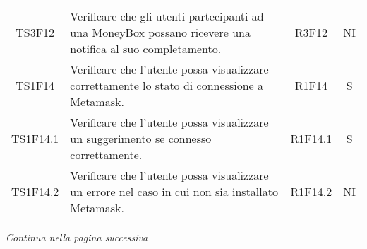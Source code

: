 \begin{table}[H]
\begin{tabular}{c|p{8cm}|c|c}
    TS3F12    & Verificare che gli utenti partecipanti ad una MoneyBox\glo{} possano ricevere una notifica al suo completamento.            & R3F12    & NI \\
    TS1F14    & Verificare che l'utente possa visualizzare correttamente lo stato di connessione a Metamask\glo{}.                          & R1F14    & S \\
    TS1F14.1  & Verificare che l'utente possa visualizzare un suggerimento se connesso correttamente.                                       & R1F14.1  & S \\
    TS1F14.2  & Verificare che l'utente possa visualizzare un errore nel caso in cui non sia installato Metamask\glo{}.                     & R1F14.2  & NI \\
  \end{tabular}
\end{table}
\begin{center}
  \textit{\small Continua nella pagina successiva}
\end{center}
